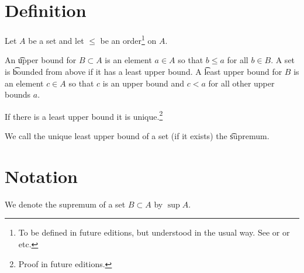 

\section*{Definition}

Let $A$ be a set and let $\leq$ be an order\footnote{To be defined in future editions, but understood in the usual way. See or or etc.}
on $A$.

An \t{upper bound} for $B \subset A$ is an element $a \in A$ so that $b \leq a$ for all $b \in B$.
A set is \t{bounded from above} if it has a least upper bound.
A \t{least upper bound} for $B$ is an element $c \in A$ so that $c$ is an upper bound and $c < a$ for all other upper bounds $a$.
\begin{proposition}
If there is a least upper bound it is unique.\footnote{Proof in future editions.}\end{proposition}
We call the unique least upper bound of a set (if it exists) the \t{supremum}.

\section*{Notation}

We denote the supremum of a set $B \subset A$ by $\sup A$.

\blankpage